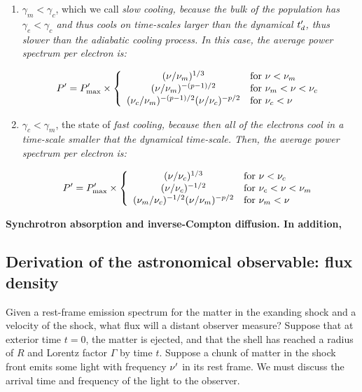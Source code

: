 \begin{enumerate}
    \item $\gamma_m < \gamma_c$, which we call \it{slow cooling}, because the bulk of the population has $\gamma_e < \gamma_c$ and thus cools on time-scales larger than the dynamical $t_d^{\prime}$, thus slower than the adiabatic cooling process. In this case, the average power spectrum per electron is:

    \begin{equation}
        P^{\prime} = P_{\mathrm{max}}^{\prime} \times \left\{ \begin{array}{cl}
                         (\nu/\nu_m)^{1/3} & \text{for } \nu < \nu_m \\
                         (\nu/\nu_m)^{-(p-1)/2} & \text{for }  \nu_m < \nu < \nu_c \\
                         (\nu_c/\nu_m)^{-(p-1)/2}(\nu/\nu_c)^{-p/2} & \text{for }  \nu_c < \nu
                         \end{array}\right.
    \end{equation}

    \item $\gamma_c < \gamma_m$, the state of \it{fast cooling}, because then all of the electrons cool in a time-scale smaller that the dynamical time-scale. Then, the average power spectrum per electron is:

    \begin{equation}
        P^{\prime} = P_{\mathrm{max}}^{\prime} \times \left\{ \begin{array}{cl}
            (\nu/\nu_c)^{1/3} & \text{for }  \nu < \nu_c \\
            (\nu/\nu_c)^{-1/2} & \text{for }  \nu_c < \nu < \nu_m \\
            (\nu_m/\nu_c)^{-1/2}(\nu/\nu_m)^{-p/2} & \text{for }  \nu_m < \nu
                         \end{array}\right.
    \end{equation}
\end{enumerate}

\bf{Synchrotron absorption and inverse-Compton diffusion.} In addition,
\subsection{Derivation of the astronomical observable: flux density}

Given a rest-frame emission spectrum for the matter in the exanding shock and a velocity of the shock, what flux will a distant observer measure? Suppose that at exterior time $t = 0$, the matter is ejected, and that the shell has reached a radius of $R$ and Lorentz factor $\Gamma$ by time $t$. Suppose a chunk of matter in the shock front emits some light with frequency $\nu^{\prime}$ in its rest frame. We must discuss the arrival time and frequency of the light to the observer.

